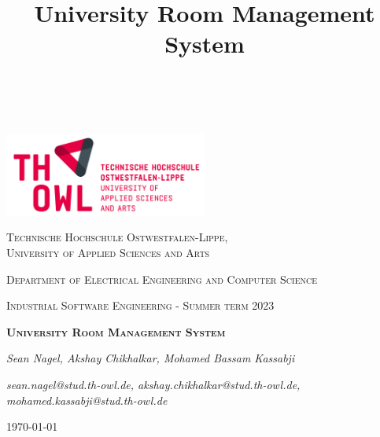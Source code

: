 \documentclass[article,onecolumn]{IEEEtran}
\begin{document}
\title{University Room Management System\\} %

\author{\\ %

}


\begin{titlepage}
	\centering
	\includegraphics[width=0.5\textwidth]{Figures/TH_OWL.jpg}\par\vspace{1cm}
	{\scshape\LARGE Technische Hochschule Ostwestfalen-Lippe,\\University of Applied Sciences and Arts \par}
	{\scshape\large Department of Electrical Engineering and Computer Science\par}
	\vspace{1cm}
	{\scshape\Large Industrial Software Engineering - Summer term 2023\par}
	\vspace{1.5cm}
	{\huge\bfseries\scshape University Room Management System\par}
	\vspace{2cm}
	{\Large\itshape Sean Nagel, Akshay Chikhalkar, Mohamed Bassam Kassabji\par}
	{\itshape sean.nagel@stud.th-owl.de, akshay.chikhalkar@stud.th-owl.de, mohamed.kassabji@stud.th-owl.de\par}
	
	\vfill
	
	{\large \today\par}
\end{titlepage}
\end{document}
